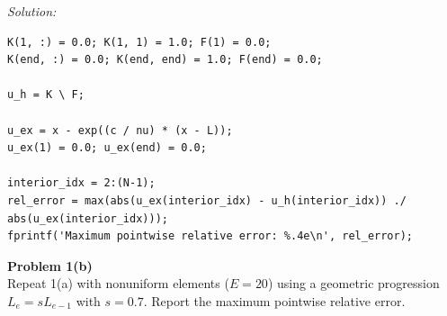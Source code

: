 \documentclass[11pt]{article}
\newenvironment{problem}[2][Problem]
    { \begin{mdframed}[backgroundcolor=gray!20] \textbf{#1 #2} \\}
    {  \end{mdframed}}
\newenvironment{solution}
    {\textit{Solution:}}
    {}
\begin{document}
\begin{solution}
\begin{lstlisting}
K(1, :) = 0.0; K(1, 1) = 1.0; F(1) = 0.0;
K(end, :) = 0.0; K(end, end) = 1.0; F(end) = 0.0;

u_h = K \ F;

u_ex = x - exp((c / nu) * (x - L));
u_ex(1) = 0.0; u_ex(end) = 0.0;

interior_idx = 2:(N-1);
rel_error = max(abs(u_ex(interior_idx) - u_h(interior_idx)) ./ abs(u_ex(interior_idx)));
fprintf('Maximum pointwise relative error: %.4e\n', rel_error);
\end{lstlisting}

\end{solution}

\begin{problem}{1(b)}
Repeat 1(a) with nonuniform elements ($E=20$) using a geometric progression $L_e = s L_{e-1}$ with $s=0.7$.
Report the maximum pointwise relative error.
\end{problem}
\end{document}
